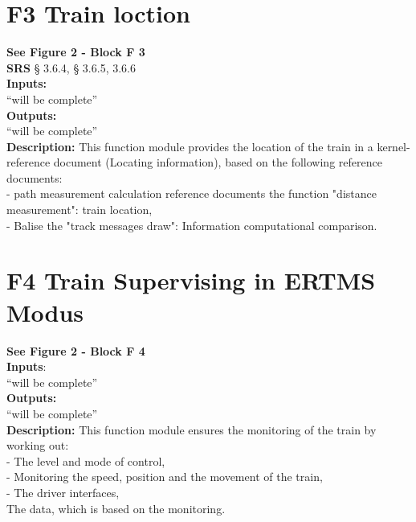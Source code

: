 \documentclass{template/openetcs_report}
\begin{document}
\newpage
\section{F3 Train loction}
\textbf{See Figure 2 - Block F 3}\\

\textbf{SRS} § 3.6.4, § 3.6.5, 3.6.6\\

  \textbf{Inputs:}\\
``will be complete''\\

 \textbf{Outputs:}\\
 ``will be complete''\\
 
\textbf{Description:} 
This function module provides the location of the train in a kernel-reference document 
(Locating information), based on the following reference documents: \\

- path measurement calculation reference documents the function "distance measurement": train location, \\

- Balise the "track messages draw": Information computational comparison.\\


 \section{F4 Train Supervising in ERTMS Modus}
 \textbf{See Figure 2 - Block F 4}\\
 
\textbf{Inputs}:\\
``will be complete''\\
 
 \textbf{Outputs:}\\
 ``will be complete''\\
 
 \textbf{Description:} 
 This function module ensures the monitoring of the train by working out: \\
 
 - The level and mode of control,\\
  
- Monitoring the speed, position and the movement of the train,\\
 
- The driver interfaces,\\
 
The data, which is based on the monitoring.\\
\end{document}
